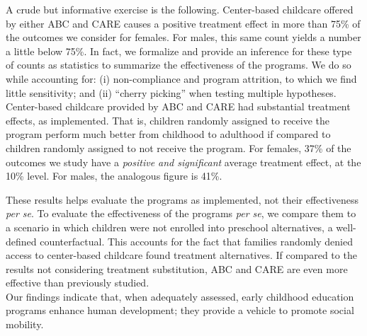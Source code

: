 \noindent A crude but informative exercise is the following. Center-based childcare offered by either ABC and CARE causes a positive treatment effect in more than 75\% of the outcomes we consider for females. For males, this same count yields a number a little below 75\%. In fact, we formalize and provide an inference for these type of counts as statistics to summarize the effectiveness of the programs. We do so while accounting for: (i) non-compliance and program attrition, to which we find little sensitivity; and (ii) ``cherry picking'' when testing multiple hypotheses.\\

\noindent Center-based childcare provided by ABC and CARE had substantial treatment effects, as implemented. That is, children randomly assigned to receive the program perform much better from childhood to adulthood if compared to children randomly assigned to not receive the program. For females, 37\% of the outcomes we study have a \textit{positive and significant} average treatment effect, at the 10\% level. For males, the analogous figure is 41\%.

\noindent These results helps evaluate the programs as implemented, not their effectiveness \textit{per se}. To evaluate the effectiveness of the programs \textit{per se}, we compare them to a scenario in which children were not enrolled into preschool alternatives,  a well-defined counterfactual. This accounts for the fact that families randomly denied access to center-based childcare found treatment alternatives. If compared to the results not considering treatment substitution, ABC and CARE are even more effective than previously studied.\\

\noindent Our findings indicate that, when adequately assessed, early childhood education programs enhance human development; they provide a vehicle to promote social mobility.

\singlespace



 